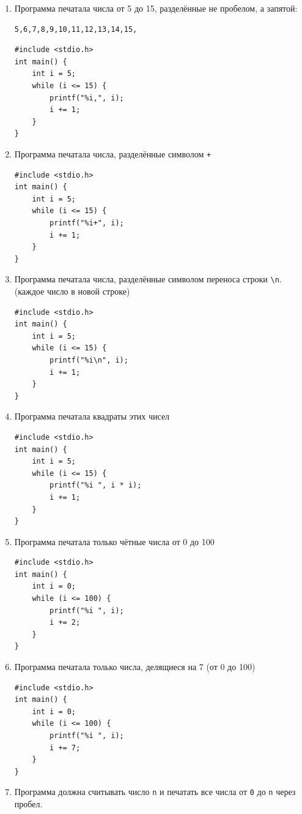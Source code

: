 \documentclass{article}
\begin{document}
\begin{enumerate}
\newpage
\item Программа печатала числа от 5 до 15, разделённые не пробелом, а запятой:
\begin{verbatim}
5,6,7,8,9,10,11,12,13,14,15,
\end{verbatim}
\begin{lstlisting}[backgroundcolor = \color{solcolor}]
#include <stdio.h>
int main() {
    int i = 5;
    while (i <= 15) {
        printf("%i,", i);
        i += 1;
    }
}
\end{lstlisting}
\item Программа печатала числа, разделённые символом \texttt{+}
\begin{lstlisting}[backgroundcolor = \color{solcolor}]
#include <stdio.h>
int main() {
    int i = 5;
    while (i <= 15) {
        printf("%i+", i);
        i += 1;
    }
}
\end{lstlisting}
\item Программа печатала числа, разделённые символом переноса строки \texttt{\textbackslash n}. (каждое число в новой строке)
\begin{lstlisting}[backgroundcolor = \color{solcolor}]
#include <stdio.h>
int main() {
    int i = 5;
    while (i <= 15) {
        printf("%i\n", i);
        i += 1;
    }
}
\end{lstlisting}
\item Программа печатала квадраты этих чисел
\begin{lstlisting}[backgroundcolor = \color{solcolor}]
#include <stdio.h>
int main() {
    int i = 5;
    while (i <= 15) {
        printf("%i ", i * i);
        i += 1;
    }
}
\end{lstlisting}
\newpage
\item Программа печатала только чётные числа от 0 до 100
\begin{lstlisting}[backgroundcolor = \color{solcolor}]
#include <stdio.h>
int main() {
    int i = 0;
    while (i <= 100) {
        printf("%i ", i);
        i += 2;
    }
}
\end{lstlisting}
\item Программа печатала только числа, делящиеся на 7  (от 0 до 100)
\begin{lstlisting}[backgroundcolor = \color{solcolor}]
#include <stdio.h>
int main() {
    int i = 0;
    while (i <= 100) {
        printf("%i ", i);
        i += 7;
    }
}
\end{lstlisting}
\item Программа должна считывать число \texttt{n} и печатать все числа от \texttt{0} до \texttt{n} через пробел.

\end{enumerate}
\end{document}

